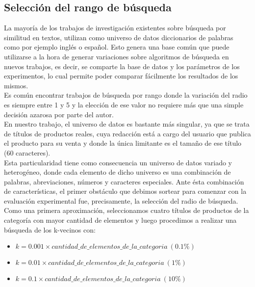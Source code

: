 \subsection{Selecci\'on del rango de b\'usqueda}

La mayor\'ia de los trabajos de investigaci\'on existentes sobre b\'usqueda por similitud en textos, utilizan como universo de datos diccionarios de palabras como por ejemplo ingl\'es o español. Esto genera una base com\'un que puede utilizarse a la hora de generar variaciones sobre algoritmos de b\'usqueda en nuevos trabajos, es decir, se comparte la base de datos y los par\'ametros de los experimentos, lo cual permite poder comparar f\'acilmente los resultados de los mismos.\\
 
Es com\'un encontrar trabajos de b\'usqueda por rango donde la variaci\'on del radio es siempre entre 1 y 5 y la elecci\'on de ese valor no requiere m\'as que una simple decisi\'on azarosa por parte del autor.\\

En nuestro trabajo, el universo de datos es bastante m\'as singular, ya que se trata de t\'itulos de productos reales, cuya redacci\'on est\'a a cargo del usuario que publica el producto para su venta y donde la \'unica limitante es el tama\~no de ese t\'itulo (60 caracteres).\\

Esta particularidad tiene como consecuencia un universo de datos variado y heterog\'eneo, donde cada elemento de dicho universo es una combinaci\'on de palabras, abreviaciones, n\'umeros y caracteres especiales. Ante \'esta combinaci\'on de caracter\'isticas, el primer obst\'aculo que debimos sortear para comenzar con la evaluaci\'on experimental fue, precisamente, la selecci\'on del radio de b\'usqueda.\\

Como una primera aproximaci\'on, seleccionamos cuatro t\'itulos de productos de la categor\'ia con mayor cantidad de elementos y luego procedimos a realizar una b\'usqueda de los k-vecinos con:\\

\begin{itemize}
\item $k= 0.001 \times  cantidad\_de\_elementos\_de\_la\_categoria\ (0.1\%)$
\item $k= 0.01 \times cantidad\_de\_elementos\_de\_la\_categoria\ (1\%)$
\item $k= 0.1 \times cantidad\_de\_elementos\_de\_la\_categoria\ (10\%)$
\end{itemize}


